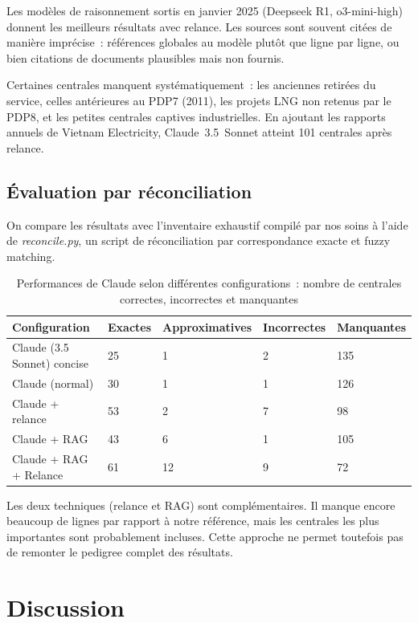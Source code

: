 \documentclass[a4paper,11pt]{report}
\begin{document}


Les modèles de raisonnement sortis en janvier 2025 (Deepseek R1, o3-mini-high) donnent les meilleurs résultats avec relance. Les sources sont souvent citées de manière imprécise~: références globales au modèle plutôt que ligne par ligne, ou bien citations de documents plausibles mais non fournis.

Certaines centrales manquent systématiquement~: les anciennes retirées du service, celles antérieures au PDP7 (2011), les projets LNG non retenus par le PDP8, et les petites centrales captives industrielles. En ajoutant les rapports annuels de Vietnam Electricity, Claude~3.5~Sonnet atteint 101 centrales après relance.

\subsection{Évaluation par réconciliation}

On compare les résultats avec l'inventaire exhaustif compilé par nos soins à l'aide de \emph{reconcile.py}, un script de réconciliation par correspondance exacte et fuzzy matching.

\begin{longtable}[]{@{}lllll@{}}
\caption{Performances de Claude selon différentes configurations~: nombre de centrales correctes, incorrectes et manquantes}\label{tab:performances}\\
\toprule
Configuration & Exactes & Approximatives & Incorrectes & Manquantes \\
\midrule
\endhead
\bottomrule
\endlastfoot
Claude (3.5 Sonnet) concise & 25 & 1 & 2 & 135 \\
Claude (normal) & 30 & 1 & 1 & 126 \\
Claude + relance & 53 & 2 & 7 & 98 \\
Claude + RAG & 43 & 6 & 1 & 105 \\
Claude + RAG + Relance & 61 & 12 & 9 & 72 \\
\end{longtable}

Les deux techniques (relance et RAG) sont complémentaires. Il manque encore beaucoup de lignes par rapport à notre référence, mais les centrales les plus importantes sont probablement incluses. Cette approche ne permet toutefois pas de remonter le pedigree complet des résultats.

\section{Discussion}
\end{document}

